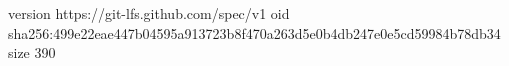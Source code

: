version https://git-lfs.github.com/spec/v1
oid sha256:499e22eae447b04595a913723b8f470a263d5e0b4db247e0e5cd59984b78db34
size 390
